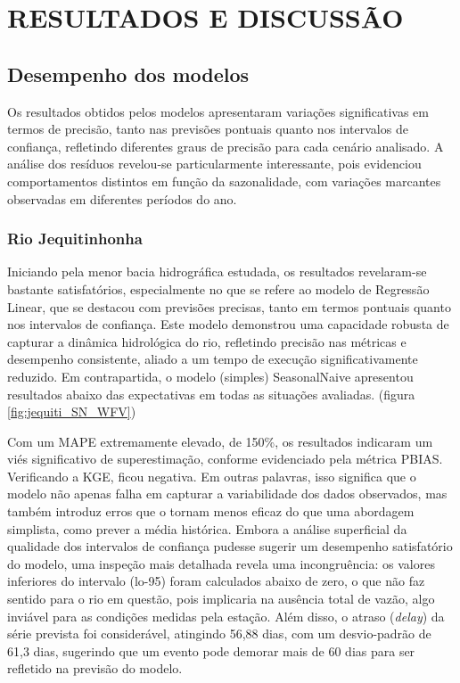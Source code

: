 \chapter{RESULTADOS E DISCUSS\~AO}
\label{cap:capitulo4}

\section{Desempenho dos modelos}

Os resultados obtidos pelos modelos apresentaram variações significativas em termos de precisão, tanto nas previsões pontuais quanto nos intervalos de confiança, refletindo diferentes graus de precisão para cada cenário analisado. A análise dos resíduos revelou-se particularmente interessante, pois evidenciou comportamentos distintos em função da sazonalidade, com variações marcantes observadas em diferentes períodos do ano.

\subsection{Rio Jequitinhonha}

Iniciando pela menor bacia hidrográfica estudada, os resultados revelaram-se bastante satisfatórios, especialmente no que se refere ao modelo de Regressão Linear, que se destacou com previsões precisas, tanto em termos pontuais quanto nos intervalos de confiança. Este modelo demonstrou uma capacidade robusta de capturar a dinâmica hidrológica do rio, refletindo precisão nas métricas e desempenho consistente, aliado a um tempo de execução significativamente reduzido. Em contrapartida, o modelo (simples) SeasonalNaive apresentou resultados abaixo das expectativas em todas as situações avaliadas. (figura \ref{fig:jequiti_SN_WFV})

Com um MAPE extremamente elevado, de 150\%, os resultados indicaram um viés significativo de superestimação, conforme evidenciado pela métrica PBIAS. Verificando a KGE, ficou negativa. Em outras palavras, isso significa que o modelo não apenas falha em capturar a variabilidade dos dados observados, mas também introduz erros que o tornam menos eficaz do que uma abordagem simplista, como prever a média histórica. Embora a análise superficial da qualidade dos intervalos de confiança pudesse sugerir um desempenho satisfatório do modelo, uma inspeção mais detalhada revela uma incongruência: os valores inferiores do intervalo (lo-95) foram calculados abaixo de zero, o que não faz sentido para o rio em questão, pois implicaria na ausência total de vazão, algo inviável para as condições medidas pela estação. Além disso, o atraso (\textit{delay}) da série prevista foi considerável, atingindo 56,88 dias, com um desvio-padrão de 61,3 dias, sugerindo que um evento pode demorar mais de 60 dias para ser refletido na previsão do modelo.

